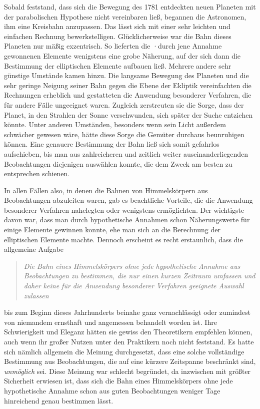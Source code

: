 Sobald feststand, dass sich die Bewegung des 1781 entdeckten neuen Planeten mit der parabolischen Hypothese nicht vereinbaren ließ, begannen die Astronomen, ihm eine Kreisbahn anzupassen. Das lässt sich mit einer sehr leichten und einfachen Rechnung bewerkstelligen. Glücklicherweise war die Bahn dieses Planeten nur mäßig exzentrisch. So lieferten die ·durch jene Annahme gewonnenen Elemente wenigstens eine grobe Näherung, auf der sich dann die Bestimmung der elliptischen Elemente aufbauen ließ. Mehrere andere sehr günstige Umstände kamen hinzu. Die langsame Bewegung des Planeten und die sehr geringe Neigung seiner Bahn gegen die Ebene der Ekliptik vereinfachten die Rechnungen erheblich und gestatteten die Anwendung besonderer Verfahren, die für andere Fälle ungeeignet waren. Zugleich zerstreuten sie die Sorge, dass der Planet, in den Strahlen der Sonne verschwunden, sich später der Suche entziehen könnte. Unter anderen Umständen, besonders wenn sein Licht außerdem schwächer gewesen wäre, hätte diese Sorge die Gemüter durchaus beunruhigen können. Eine genauere Bestimmung der Bahn ließ sich somit gefahrlos aufschieben, bis man aus zahlreicheren und zeitlich weiter auseinanderliegenden Beobachtungen diejenigen auswählen konnte, die dem Zweck am besten zu entsprechen schienen.

In allen Fällen also, in denen die Bahnen von Himmelskörpern aus Beobachtungen abzuleiten waren, gab es beachtliche Vorteile, die die Anwendung besonderer Verfahren nahelegten oder wenigstens ermöglichten. Der wichtigste davon war, dass man durch hypothetische Annahmen schon Näherungswerte für einige Elemente gewinnen konnte, ehe man sich an die Berechnung der elliptischen Elemente machte. Dennoch erscheint es recht erstaunlich, dass die allgemeine Aufgabe

\begin{quote}\itshape
Die Bahn eines Himmelskörpers ohne jede hypothetische Annahme aus Beobachtungen zu bestimmen, die nur einen kurzen Zeitraum umfassen und daher keine für die Anwendung besonderer Verfahren geeignete Auswahl zulassen
\end{quote}
\noindent bis zum Beginn dieses Jahrhunderts beinahe ganz vernachlässigt oder zumindest von niemandem ernsthaft und angemessen behandelt worden ist. Ihre Schwierigkeit und Eleganz hätten sie gewiss den Theoretikern empfehlen können, auch wenn ihr großer Nutzen unter den Praktikern noch nicht feststand. Es hatte sich nämlich allgemein die Meinung durchgesetzt, dass eine solche vollständige Bestimmung aus Beobachtungen, die auf eine kürzere Zeitspanne beschränkt sind, \emph{unmöglich} sei. Diese Meinung war schlecht begründet, da inzwischen mit größter Sicherheit erwiesen ist, dass sich die Bahn eines Himmelskörpers ohne jede hypothetische Annahme schon aus guten Beobachtungen weniger Tage hinreichend genau bestimmen lässt.

